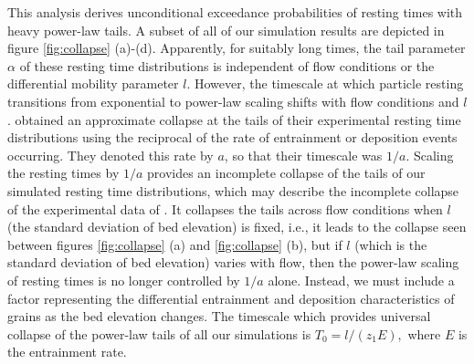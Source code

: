 \documentclass[draft]{agujournal2018}
\begin{document}
This analysis derives unconditional exceedance probabilities of resting times with heavy power-law tails. 
A subset of all of our simulation results are depicted in figure \ref{fig:collapse} (a)-(d). 
Apparently, for suitably long times, the tail parameter $\alpha$ of these resting time distributions is independent of flow conditions or the differential mobility parameter $l$. 
However, the timescale at which particle resting transitions from exponential to power-law scaling shifts with flow conditions and $l$. 
\citet{Martin2014} obtained an approximate collapse at the tails of their experimental resting time distributions using the reciprocal of the rate of entrainment or deposition events occurring. They denoted this rate by $a$, so that their timescale was $1/a$.
Scaling the resting times by $1/a$ provides an incomplete collapse of the tails of our simulated resting time distributions, which may describe the incomplete collapse of the experimental data of \citet{Martin2014}.  
It collapses the tails across flow conditions when $l$ (the standard deviation of bed elevation) is fixed, i.e., it leads to the collapse seen between figures \ref{fig:collapse} (a) and \ref{fig:collapse} (b), but if $l$ (which is the standard deviation of bed elevation) varies with flow, then the power-law scaling of resting times is no longer controlled by $1/a$ alone. 
Instead, we must include a factor representing the differential entrainment and deposition characteristics of grains as the bed elevation changes. 
The timescale which provides universal collapse of the power-law tails of all our simulations is $T_0 = l/(z_1E),$ where $E$ is the entrainment rate.
\end{document}
